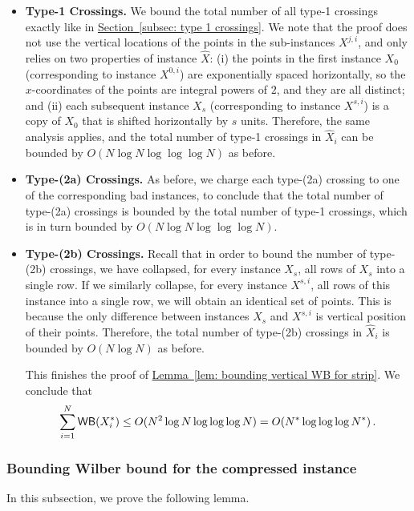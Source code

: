 \documentclass[11pt]{article}
\numberwithin{equation}{section}
\theoremstyle{definition}
\theoremstyle{plain}
\newcommand{\expref}[2]{\hyperref[#2]{#1~\ref{#2}}}
\begin{document}
\begin{itemize}
    \item {\bf Type-1 Crossings.}
We bound the total number of all type-1 crossings exactly like in \expref{Section}{subsec: type 1 crossings}. We note that the proof does not use the vertical locations of the points in the sub-instances $X^{j,i}$, and only relies on two properties of instance $\hat X$: (i) the points in the first instance $X_0$ (corresponding to instance $X^{0,i}$) are exponentially spaced horizontally, so the $x$-coordinates of the points are integral powers of $2$, and they are all distinct; and (ii) each subsequent instance $X_s$ (corresponding to instance $X^{s,i}$) is a copy of $X_0$ that is shifted horizontally by $s$ units. Therefore, the same analysis applies, and the total number of type-1 crossings in $\hat X_i$ can be bounded by $O(N\log N\log\log\log N)$ as before.

\item {\bf Type-(2a) Crossings.}
As before, we charge each type-(2a) crossing to one of the corresponding bad instances, to conclude that the total number of type-(2a) crossings is bounded by the total number of type-1 crossings, which is in turn bounded by $O(N\log N\log\log\log N)$.

\item  {\bf Type-(2b) Crossings.}
Recall that in order to bound the number of type-(2b) crossings, we have collapsed, for every instance $X_s$, all rows of $X_s$ into a single row. If we similarly collapse, for every instance $X^{s,i}$, all rows of this instance into a single row, we will obtain an identical set of points. This is because the only difference between instances $X_s$ and $X^{s,i}$ is vertical position of their points. Therefore, the total number of type-(2b) crossings in $\hat X_i$ is bounded by $O(N\log N)$ as before.

This finishes the proof of \expref{Lemma}{lem: bounding vertical WB for strip}. We conclude that %
\begin{equation}
  \sum_{i=1}^N\mathsf{WB}(X_i^*)\leq O(N^2\log N\log\log\log N)=O(N^*\log\log\log N^*)\,.
\end{equation}
\end{itemize}







\subsubsection{Bounding Wilber bound for the compressed instance}
In this subsection, we prove the following lemma.
\end{document}
